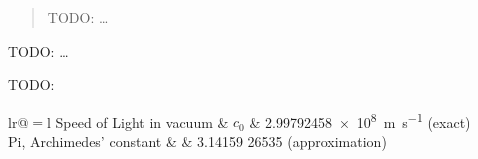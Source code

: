 \documentclass[
	12pt, %
	english, %
	onehalfspacing, %
	liststotoc, %
	toctotoc, %
	parskip, %
	headsepline, %
]{MastersDoctoralThesis} %
\begin{document}

\begin{abstract}
	\addchaptertocentry{\abstractname} %
	TODO:
	\ldots
\end{abstract}


\begin{extraAbstract}
	\addchaptertocentry{\abstractname} %
	TODO:
	\ldots
\end{extraAbstract}


\begin{acknowledgements}
	\addchaptertocentry{\acknowledgementname} %
	TODO:
\end{acknowledgements}


\tableofcontents %
\listoffigures %
\listoftables %
\listofalgorithms %


\begin{constants}{lr@{${}={}$}l} %
	Speed of Light in vacuum & $c_{0}$ & \SI{2.99792458e8}{\meter\per\second} (exact)\\
	Pi, Archimedes' constant & \pi & 3.14159 26535 (approximation)
\end{constants}
\end{document}
